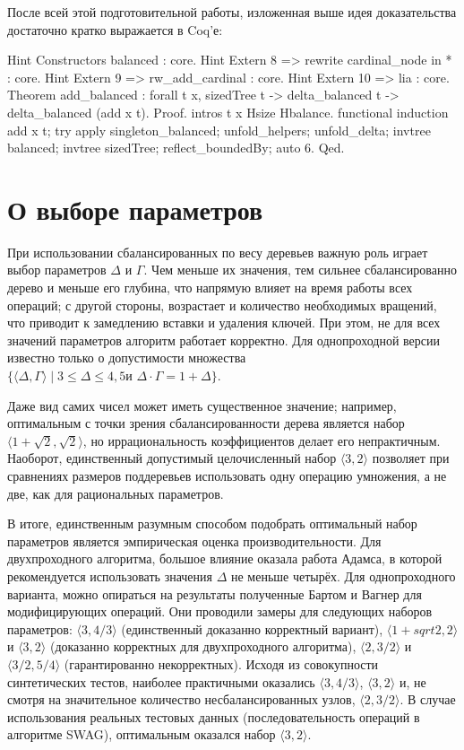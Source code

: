 \documentclass[a4paper,14pt]{extarticle}
\begin{document}
После всей этой подготовительной работы,
изложенная выше идея доказательства
достаточно кратко выражается в Coq'е:
\begin{coqcode}
Hint Constructors balanced : core.
Hint Extern 8 => rewrite cardinal_node in * : core.
Hint Extern 9 => rw_add_cardinal : core.
Hint Extern 10 => lia : core.
Theorem add_balanced : forall t x,
  sizedTree t -> delta_balanced t ->
  delta_balanced (add x t).
Proof.
  intros t x Hsize Hbalance.
  functional induction add x t;
  try apply singleton_balanced;
  unfold_helpers; unfold_delta;
  invtree balanced; invtree sizedTree;
  reflect_boundedBy;
  auto 6.
Qed.
\end{coqcode}

\clearpage
\section{О выборе параметров}

При использовании сбалансированных по весу деревьев
важную роль играет выбор параметров \( \Delta \) и \( \Gamma \).
Чем меньше их значения,
тем сильнее сбалансированно дерево
и меньше его глубина,
что напрямую влияет на время работы всех операций;
с другой стороны,
возрастает и количество необходимых вращений,
что приводит к замедлению вставки и удаления ключей.
При этом, не для всех значений параметров
алгоритм работает корректно.
Для однопроходной версии известно только о
допустимости множества
\( \{ \langle \Delta, \Gamma \rangle \mid
\text{$3 \leqslant \Delta \leqslant 4,5$
и $\Delta \cdot \Gamma = 1 + \Delta$} \} \)\cite{lai}. 


Даже вид самих чисел может иметь существенное значение;
например, оптимальным
с точки зрения сбалансированности дерева является
набор \( \langle 1 + \sqrt{2}, \sqrt{2} \rangle \),
но иррациональность коэффициентов
делает его непрактичным\cite{roura}.
Наоборот,
единственный допустимый целочисленный набор \( \langle 3, 2 \rangle \)
позволяет при сравнениях размеров поддеревьев
использовать одну операцию умножения,
а не две, как для рациональных параметров.

В итоге, единственным разумным способом
подобрать оптимальный набор параметров
является эмпирическая оценка производительности.
Для двухпроходного алгоритма,
большое влияние оказала работа Адамса\cite{adams},
в которой рекомендуется использовать
значения \( \Delta \) не меньше четырёх.
Для однопроходного варианта,
можно опираться на результаты полученные
Бартом и Вагнер для модифицирующих операций\cite{barth}.
Они проводили замеры для следующих наборов параметров:
\( \langle 3, 4/3 \rangle \)
(единственный доказанно корректный вариант),
\( \langle 1 + sqrt{2}, 2 \rangle \) и
\( \langle 3, 2 \rangle \)
(доказанно корректных для двухпроходного алгоритма),
\( \langle 2, 3/2 \rangle \) и
\( \langle 3/2, 5/4 \rangle \)
(гарантированно некорректных).
Исходя из совокупности синтетических тестов,
наиболее практичными
оказались \( \langle 3, 4/3 \rangle \),
\( \langle 3, 2 \rangle \)
и, не смотря на значительное количество несбалансированных узлов,
\( \langle 2, 3/2 \rangle \).
В случае использования реальных тестовых данных
(последовательность операций в алгоритме SWAG\cite{swag}),
оптимальным оказался набор \( \langle 3, 2 \rangle \).
\end{document}
